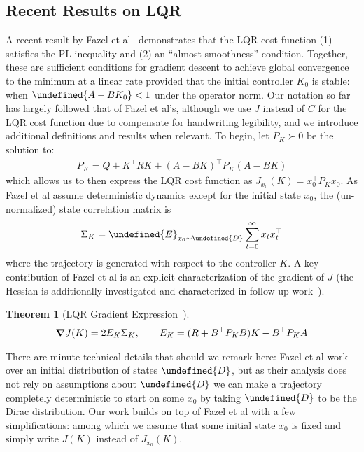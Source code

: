 \documentclass[11pt]{article}  %
\newtheorem{theorem}{Theorem}
\let\mbb\undefined
\newcommand{\mbb}[1]{\mathbb{#1}}
\let\mcal\undefined
\newcommand{\mcal}[1]{\mathcal{#1}}
\let\norm\undefined
\newcommand{\norm}[1]{\lVert #1 \rVert}
\begin{document}
\subsection{Recent Results on LQR}
A recent result by Fazel et al~\cite{fazel2018global} demonstrates
that the LQR cost function (1) satisfies the PL inequality
and (2) an ``almost smoothness'' condition.
Together, these are sufficient conditions for gradient descent
to achieve global convergence to the minimum at a linear rate
provided that the initial controller \(K_0\) is stable:
when \(\norm{A - BK_0} < 1\) under the operator norm.
Our notation so far has largely followed that of Fazel et al's,
although we use \(J\) instead of \(C\) for the LQR cost function
due to compensate for handwriting legibility,
and we introduce additional definitions and results when relevant.
To begin, let \(P_K \succ 0\) be the solution to:
\begin{align}
  P_K = Q + K^\top R K + (A - BK)^\top P_K (A - BK)
\end{align}
which allows us to then express the LQR cost function as
\(J_{x_0} (K) = x_0 ^\top P_K x_0\).
As Fazel et al assume deterministic dynamics except for the initial
state \(x_0\),
the (un-normalized) state correlation matrix is
\begin{align}
  \Sigma_K = \mbb{E}_{x_0 \sim \mcal{D}} \sum_{t = 0}^{\infty} x_t x_t ^\top
\end{align}
where the trajectory is generated with respect to the controller \(K\).
A key contribution of Fazel et al is an explicit characterization of
the gradient of \(J\) (the Hessian is additionally
investigated and characterized in follow-up work~\cite{bu2019lqr}).

\begin{theorem}[LQR Gradient Expression~\cite{fazel2018global}]
  \begin{align}
    \grad J(K) = 2 E_K \Sigma_K,
      \qquad
      E_K = (R + B^\top P_K B)K - B^\top P_K A
  \end{align}
\end{theorem}

There are minute technical details that should we remark here:
Fazel et al work over an initial distribution of states \(\mcal{D}\),
but as their analysis does not rely on assumptions about \(\mcal{D}\)
we can make a trajectory completely deterministic to start on some
\(x_0\) by taking \(\mcal{D}\) to be the Dirac distribution.
Our work builds on top of Fazel et al with a few simplifications:
among which we assume that some initial state \(x_0\) is fixed
and simply write \(J(K)\) instead of \(J_{x_0} (K)\).
\end{document}
